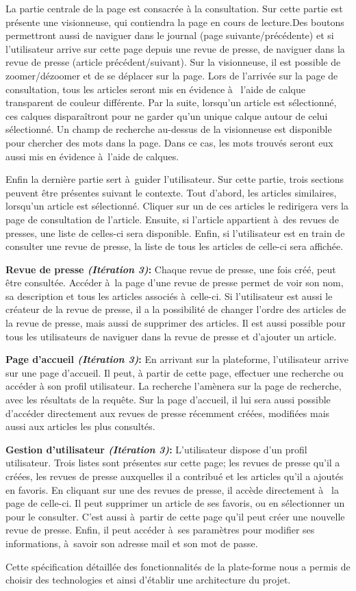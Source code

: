 	La partie centrale de la page est consacrée à la consultation. Sur cette partie est présente une visionneuse, qui contiendra la page en cours de lecture.Des boutons permettront aussi de naviguer dans le journal (page suivante/précédente) et si l'utilisateur arrive sur cette page depuis une revue de presse, de naviguer dans la revue de presse (article précédent/suivant). Sur la visionneuse, il est possible de zoomer/dézoomer et de se déplacer sur la page. Lors de l'arrivée sur la page de consultation, tous les articles seront mis en évidence à  l'aide de calque transparent de couleur différente. Par la suite, lorsqu'un article est sélectionné, ces calques disparaîtront pour ne garder qu'un unique calque autour de celui sélectionné. Un champ de recherche au-dessus de la visionneuse est disponible pour chercher des mots dans la page. Dans ce cas, les mots trouvés seront eux aussi mis en évidence à l'aide de calques. 
	
	Enfin la dernière partie sert à guider l'utilisateur. Sur cette partie, trois sections peuvent être présentes suivant le contexte. Tout d'abord, les articles similaires, lorsqu'un article est sélectionné. Cliquer sur un de ces articles le redirigera vers la page de consultation de l'article. Ensuite, si l'article appartient à des revues de presses, une liste de celles-ci sera disponible. Enfin, si l'utilisateur est en train de consulter une revue de presse, la liste de tous les articles de celle-ci sera affichée.


	\textbf{Revue de presse \textit{(Itération 3)}:} Chaque revue de presse, une fois créé, peut être consultée. Accéder à la page d'une revue de presse permet de voir son nom, sa description et tous les articles associés à celle-ci. Si l'utilisateur est aussi le créateur de la revue de presse, il a la possibilité de changer l'ordre des articles de la revue de presse, mais aussi de supprimer des articles. Il est aussi possible pour tous les utilisateurs de naviguer dans la revue de presse et d'ajouter un article.

	\textbf{Page d'accueil \textit{(Itération 3)}:} En arrivant sur la plateforme, l'utilisateur arrive sur une page d'accueil. Il peut, à partir de cette page, effectuer une recherche ou accéder à son profil utilisateur. La recherche l'amènera sur la page de recherche, avec les résultats de la requête. Sur la page d'accueil, il lui sera aussi possible d'accéder directement aux revues de presse récemment créées, modifiées mais aussi aux articles les plus consultés.

	\textbf{Gestion d'utilisateur \textit{(Itération 3)}:} L'utilisateur dispose d'un profil utilisateur. Trois listes sont présentes sur cette page; les revues de presse qu'il a créées, les revues de presse auxquelles il a contribué et les articles qu'il a ajoutés en favoris. En cliquant sur une des revues de presse, il accède directement à  la page de celle-ci. Il peut supprimer un article de ses favoris, ou en sélectionner un pour le consulter. C'est aussi à partir de cette page qu'il peut créer une nouvelle revue de presse. Enfin, il peut accéder à ses paramètres pour modifier ses informations, à savoir son adresse mail et son mot de passe.

Cette spécification détaillée des fonctionnalités de la plate-forme nous a permis de choisir des technologies et ainsi d'établir une architecture du projet.
